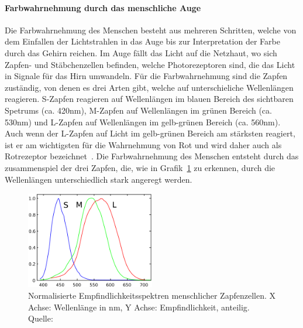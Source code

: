 \documentclass[12pt, a4paper, ngerman]{article}
\begin{document}
\paragraph{Farbwahrnehmung durch das menschliche Auge}
Die Farbwahrnehmung des Menschen besteht aus mehreren Schritten, 
welche von dem Einfallen der Lichtstrahlen in das Auge bis zur Interpretation der Farbe durch das Gehirn reichen.
Im Auge fällt das Licht auf die Netzhaut, wo sich Zapfen- und Stäbchenzellen befinden, 
welche Photorezeptoren sind, die das Licht in Signale für das Hirn umwandeln.
Für die Farbwahrnehmung sind die Zapfen zuständig, von denen es drei Arten gibt, welche auf unterschieliche Wellenlängen reagieren.
S-Zapfen reagieren auf Wellenlängen im blauen Bereich des sichtbaren Spetrums (ca. 420nm), 
M-Zapfen auf Wellenlängen im grünen Bereich (ca. 530nm) und L-Zapfen auf Wellenlängen im gelb-grünen Bereich (ca. 560nm).
Auch wenn der L-Zapfen auf Licht im gelb-grünen Bereich am stärksten reagiert, 
ist er am wichtigsten für die Wahrnehmung von Rot und wird daher auch als Rotrezeptor bezeichnet~\cite{Zapfen_Auge_2023}.
Die Farbwahrnehmung des Menschen entsteht durch das zusammenspiel der drei Zapfen, 
die, wie in Grafik~\ref{fig:LMS} zu erkennen, durch die Wellenlängen unterschiedlich stark angeregt werden. 

\begin{figure}
  \centering
  \includegraphics[width=0.5\textwidth]{Grafiken/LMS.png}
  \caption{Normalisierte Empfindlichkeitsspektren menschlicher Zapfenzellen. X Achse: Wellenlänge in nm, Y Achse: Empfindlichkeit, anteilig. Quelle: \cite{LMS_color_space_2023}}
  \label{fig:LMS}
\end{figure}
\end{document}
